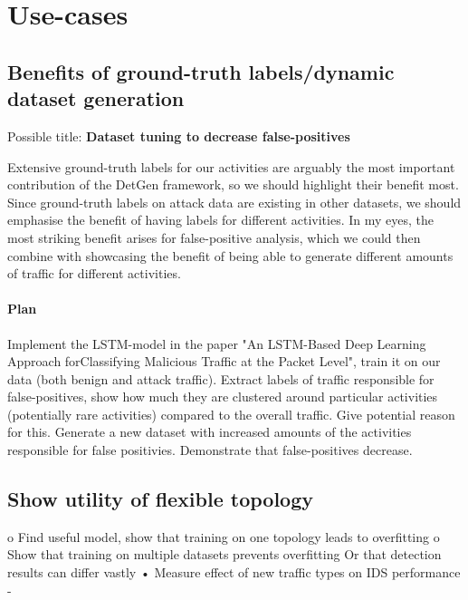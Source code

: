 \documentclass[sigconf]{acmart}
\begin{document}
\section{Use-cases}


\subsection{Benefits of ground-truth labels/dynamic dataset generation}

Possible title: \textbf{Dataset tuning to decrease false-positives}

Extensive ground-truth labels for our activities are arguably the most important contribution of the DetGen framework, so we should highlight their benefit most. Since ground-truth labels on attack data are existing in other datasets, we should emphasise the benefit of having labels for different activities. In my eyes, the most striking benefit arises for false-positive analysis, which we could then combine with showcasing the benefit of being able to generate different amounts of traffic for different activities.


\paragraph{Plan}
Implement the LSTM-model in the paper "An LSTM-Based Deep Learning Approach forClassifying Malicious Traffic at the Packet Level", train it on our data (both benign and attack traffic). Extract labels of traffic responsible for false-positives, show how much they are clustered around particular activities (potentially rare activities) compared to the overall traffic. Give potential reason for this. Generate a new dataset with increased amounts of the activities responsible for false positivies. Demonstrate that false-positives decrease.




\subsection{Show utility of flexible topology}


	o	Find useful model, show that training on one topology leads to overfitting
	o	Show that training on multiple datasets prevents overfitting
		Or that detection results can differ vastly
•	Measure effect of new traffic types on IDS performance
 	- 
\end{document}
